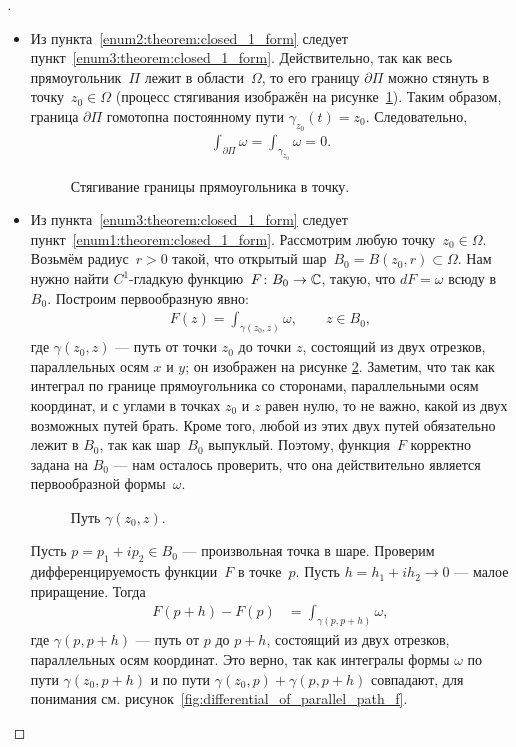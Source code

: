 \documentclass[../complex-analysis.tex]{subfiles}
\begin{document}
\begin{proof}[]
\begin{itemize}
  \item Из пункта~\ref{enum2:theorem:closed_1_form} следует пункт~\ref{enum3:theorem:closed_1_form}. Действительно, так как весь прямоугольник~$\Pi$ лежит в области~$ \Omega $, то его границу $\partial \Pi$ можно стянуть в точку~$z_0\in\Omega$ (процесс стягивания изображён на рисунке~\ref{fig:rectangle_into_point}). Таким образом, граница $\partial\Pi$ гомотопна постоянному пути $\gamma_{z_0}(t) = z_0$. Следовательно,
   \begin{align*}
    \int_{\partial\Pi} \omega = \int_{\gamma_{z_0}}   \omega = 0.
   \end{align*} 
   \begin{figure}[ht]
    \centering
    \caption{Стягивание границы прямоугольника в точку.}
    \label{fig:rectangle_into_point}
   \end{figure}

  \item Из пункта~\ref{enum3:theorem:closed_1_form} следует пункт~\ref{enum1:theorem:closed_1_form}. Рассмотрим любую точку~$ z_0 \in \Omega $. Возьмём радиус~$ r > 0 $ такой, что открытый шар~$ B_0 = B(z_0, r) \subset \Omega $. Нам нужно найти $ C^{1} $-гладкую функцию~$ F \colon B_0 \to \mathbb{C} $, такую, что $ dF = \omega $ всюду в $ B_0 $. Построим первообразную явно:
   \begin{align*}
    F(z) = \int_{\gamma(z_0, z)} \omega, \qquad z \in B_0,
   \end{align*} где $ \gamma(z_0, z) $ --- путь от точки $ z_0 $ до точки $ z $, состоящий из двух отрезков, параллельных осям $ x $ и $ y $; он изображен на рисунке \ref{fig:parrallel_path_in_oblast}. Заметим, что так как интеграл по границе прямоугольника со сторонами, параллельными осям координат, и с углами в точках $ z_0 $ и $ z $ равен нулю, то не важно, какой из двух возможных путей брать. Кроме того, любой из этих двух путей обязательно лежит в $ B_0 $, так как шар~$ B_0 $ выпуклый. Поэтому, функция~$ F $ корректно задана на $ B_0 $ --- нам осталось проверить, что она действительно является первообразной формы~$ \omega $.

   \begin{figure}[ht]
    \centering
    \caption{Путь $ \gamma(z_0, z) $.}
    \label{fig:parrallel_path_in_oblast}
   \end{figure}

   Пусть $ p = p_1 + ip_2 \in B_0 $ --- произвольная точка в шаре. Проверим дифференцируемость функции~$ F $ в точке~$ p $. Пусть $ h = h_1 + ih_2 \to 0 $ --- малое приращение. Тогда
   \begin{align*}
    F(p + h) - F(p) &= \int_{\gamma(p, p + h)}   \omega,
   \end{align*} где $ \gamma(p, p + h) $ --- путь от  $ p $  до $ p + h $, состоящий из двух отрезков, параллельных осям координат. Это верно, так как интегралы формы $ \omega $ по пути $ \gamma(z_0,p+h) $ и по пути $ \gamma(z_0, p) + \gamma(p,p+h) $ совпадают, для понимания см. рисунок~\ref{fig:differential_of_parallel_path_f}.


\end{itemize}
\end{proof}
\end{document}
